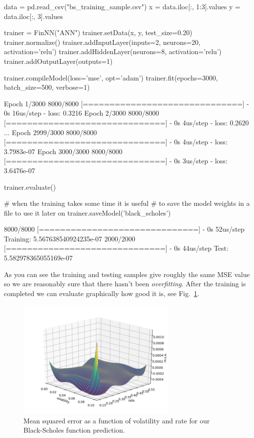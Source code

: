 \begin{ipython}
data = pd.read_csv("bs_training_sample.csv")
x = data.iloc[:, 1:3].values
y = data.iloc[:, 3].values

trainer = FinNN("ANN")
trainer.setData(x, y, test_size=0.20)
trainer.normalize()
trainer.addInputLayer(inputs=2, neurons=20, activation='relu')
trainer.addHiddenLayer(neurons=8, activation='relu')
trainer.addOutputLayer(outputs=1)

trainer.compileModel(loss='mse', opt='adam')
trainer.fit(epochs=3000, batch_size=500, verbose=1)
\end{ipython}
\begin{ioutput}
Epoch 1/3000
8000/8000 [==============================] - 0s 16us/step - loss: 0.3216
Epoch 2/3000
8000/8000 [==============================] - 0s 4us/step - loss: 0.2620
...
Epoch 2999/3000
8000/8000 [==============================] - 0s 4us/step - loss: 3.7983e-07
Epoch 3000/3000
8000/8000 [==============================] - 0s 3us/step - loss: 3.6476e-07
\end{ioutput}
\begin{ipython}
trainer.evaluate()

# when the training takes some time it is useful
# to save the model weights in a file to use it later on
trainer.saveModel('black_scholes')
\end{ipython}
\begin{ioutput}
8000/8000 [==============================] - 0s 52us/step
Training: 5.567638540924235e-07
2000/2000 [==============================] - 0s 44us/step
Test: 5.582978365055169e-07
\end{ioutput}

As you can see the training and testing samples give roughly the same MSE value so we are reasonably sure that there hasn't been \emph{overfitting}.
After the training is completed we can evaluate graphically how good it is, see Fig.~\ref{fig:vol_rate}. 

\begin{figure}[htb]
	\centering
	\includegraphics[width=0.7\textwidth]{figures/vol_rate}
	\caption{Mean squared error as a function of volatility and rate for our Black-Scholes function prediction.}
	\label{fig:vol_rate}
\end{figure}

